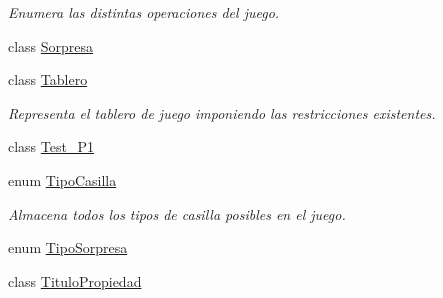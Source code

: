 \begin{DoxyCompactItemize}
\begin{DoxyCompactList}\small\item\em Enumera las distintas operaciones del juego. \end{DoxyCompactList}\item 
class \hyperlink{classcivitas_1_1Sorpresa}{Sorpresa}
\item 
class \hyperlink{classcivitas_1_1Tablero}{Tablero}
\begin{DoxyCompactList}\small\item\em Representa el tablero de juego imponiendo las restricciones existentes. \end{DoxyCompactList}\item 
class \hyperlink{classcivitas_1_1Test__P1}{Test\+\_\+\+P1}
\item 
enum \hyperlink{enumcivitas_1_1TipoCasilla}{Tipo\+Casilla}
\begin{DoxyCompactList}\small\item\em Almacena todos los tipos de casilla posibles en el juego. \end{DoxyCompactList}\item 
enum \hyperlink{enumcivitas_1_1TipoSorpresa}{Tipo\+Sorpresa}
\item 
class \hyperlink{classcivitas_1_1TituloPropiedad}{Titulo\+Propiedad}
\end{DoxyCompactItemize}
